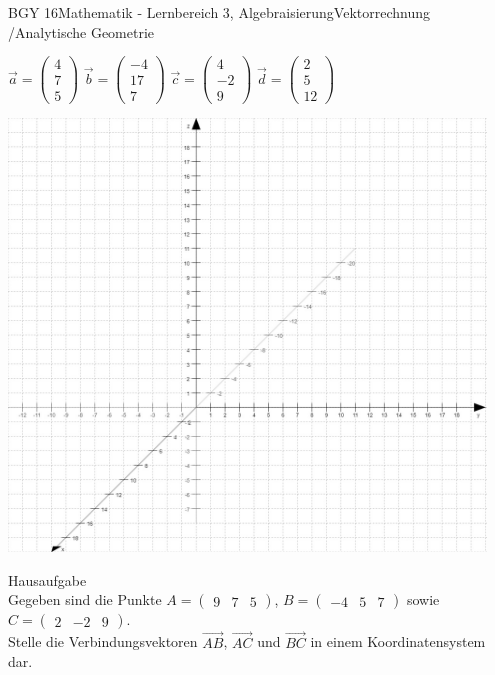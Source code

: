 \documentclass[oneside,openany,headings=optiontotoc,11pt,numbers=noenddot]{scrreprt}
\begin{document}
\begin{worksheet}{BGY 16}{Mathematik - Lernbereich 3, Algebraisierung}{Vektorrechnung /Analytische Geometrie}
\begin{framed}
			\par
			\( \overrightarrow{a} = \begin{pmatrix} 4 \\ 7 \\ 5\end{pmatrix}\) \hfill \(\overrightarrow{b} = \begin{pmatrix}-4 \\ 17 \\ 7 \end{pmatrix}\) \hfill \( \overrightarrow{c} = \begin{pmatrix}4 \\ -2 \\ 9\end{pmatrix}\) \hfill \( \overrightarrow{d} = \begin{pmatrix}
			2 \\ 5 \\ 12 \end{pmatrix}\)
			\par
			\bigskip
			\noindent
			\includegraphics[width=0.95\textwidth]{Bilder/Koord3D.jpg}
		\end{framed}
		\begin{framed}
			\color{codegray}\tiny{Hausaufgabe}\\
			\color{black}
			\noindent
			\normalsize
			Gegeben sind die Punkte \( A = \begin{pmatrix} 9 & 7 & 5\end{pmatrix}\), \(B = \begin{pmatrix}-4 & 5 & 7 \end{pmatrix}\) sowie \( C = \begin{pmatrix}2 & -2 & 9\end{pmatrix}\).\\
			Stelle die Verbindungsvektoren 
			\( \overrightarrow{AB}\), \(\overrightarrow{AC}\) und \(\overrightarrow{BC}\) in einem Koordinatensystem dar.
		\end{framed}
	\end{worksheet}
\end{document}
